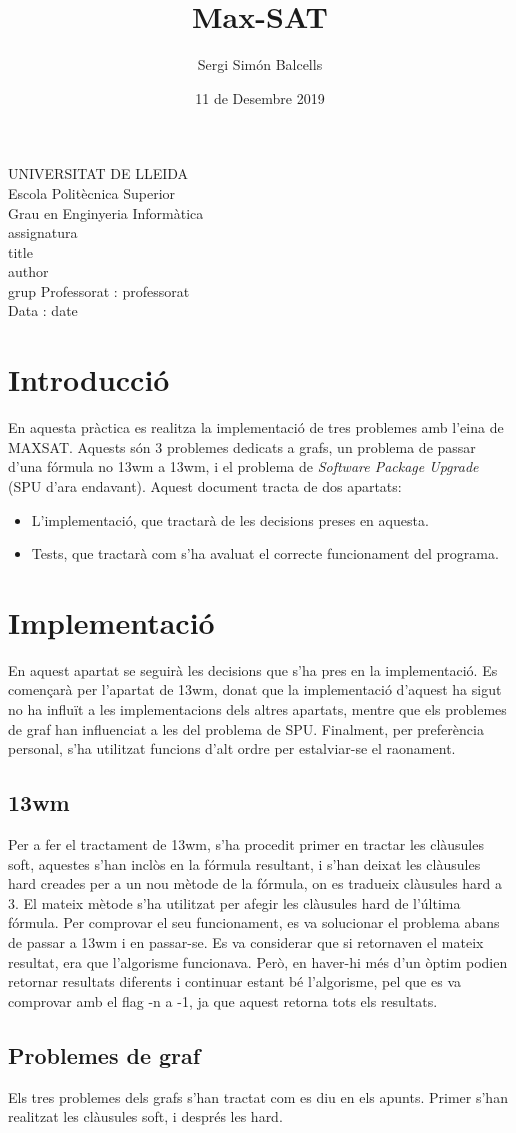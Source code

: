 \documentclass{article}
\title{Max-SAT}
\author{Sergi Simón Balcells}
\date{11 de Desembre 2019}
\renewcommand{\maketitle}{ %
	\begin{titlepage}
		\raggedright{UNIVERSITAT DE LLEIDA \\
			Escola Politècnica Superior \\
			Grau en Enginyeria Informàtica\\
			\1assignatura\\
}
		\vspace{5cm}
		\centering\huge{\5title \\}
		\vspace{3cm}
		\large{\6author} \\
		\normalsize{\3grup}
		\vfill
		Professorat : \4professorat \\
		Data : \7date
\end{titlepage}}
\begin{document}
	\maketitle
	\newpage

\section{Introducció}
En aquesta pràctica es realitza la implementació de tres problemes amb l'eina de MAXSAT.
Aquests són 3 problemes dedicats a grafs, un problema de passar d'una fórmula no 13wm a 13wm, i
el problema de \textit{Software Package Upgrade} (SPU d'ara endavant). Aquest document tracta de dos
apartats:
\begin{itemize}
	\item L'implementació, que tractarà de les decisions preses en aquesta.
	\item Tests, que tractarà com s'ha avaluat el correcte funcionament del programa.
\end{itemize}
\section{Implementació}
En aquest apartat se seguirà les decisions que s'ha pres en la implementació.
Es començarà per l'apartat de 13wm, donat que la implementació d'aquest ha sigut
no ha influït a les implementacions dels altres apartats, mentre que els problemes de 
graf han influenciat a les del problema de SPU. Finalment, per preferència personal, 
s'ha utilitzat funcions d'alt ordre per estalviar-se el raonament. 
\subsection{13wm}
Per a fer el tractament de 13wm, s'ha procedit primer en tractar les clàusules soft, aquestes
s'han inclòs en la fórmula resultant, i s'han deixat les clàusules hard creades per a un nou mètode
de la fórmula, on es tradueix clàusules hard a 3. El mateix mètode s'ha utilitzat per afegir les clàusules
hard de l'última fórmula. Per comprovar el seu funcionament, es va solucionar el problema abans de passar
a 13wm i en passar-se. Es va considerar que si retornaven el mateix resultat, era que l'algorisme funcionava. Però, 
en haver-hi més d'un òptim podien retornar resultats diferents i continuar estant bé l'algorisme, pel que es va comprovar
amb el flag -n a -1, ja que aquest retorna tots els resultats.
\subsection{Problemes de graf}
Els tres problemes dels grafs s'han tractat com es diu en els apunts. Primer s'han realitzat les clàusules soft, 
i després les hard.
\end{document}

